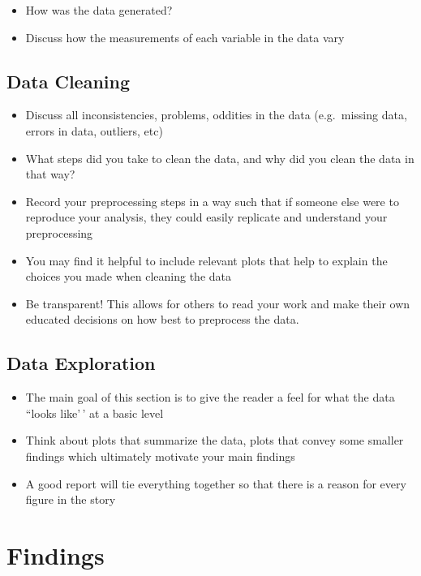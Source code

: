 \documentclass[11pt,letterpaper]{article}
\begin{document}
\begin{itemize}
\item How was the data generated?
\item Discuss how the measurements of each variable in the data vary
\end{itemize}

\subsection{Data Cleaning}\label{data-cleaning}

\begin{itemize}
\item Discuss all inconsistencies, problems, oddities in the data (e.g.~missing data, errors in data, outliers, etc)
\item What steps did you take to clean the data, and why did you clean the data in that way?
\item Record your preprocessing steps in a way such that if someone else were to reproduce your analysis, they could easily replicate and understand your preprocessing
\item You may find it helpful to include relevant plots that help to explain the choices you made when cleaning the data
\item Be transparent! This allows for others to read your work and make their own educated decisions on how best to preprocess the data.
\end{itemize}

\subsection{Data Exploration}\label{data-exploration}

\begin{itemize}
\item The main goal of this section is to give the reader a feel for what the data ``looks like'\,' at a basic level
\item Think about plots that summarize the data, plots that convey some smaller findings which ultimately motivate your main findings
\item A good report will tie everything together so that there is a reason for every figure in the story
\end{itemize}

\section{Findings}\label{findings}
\end{document}
